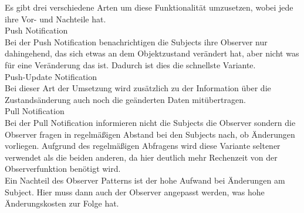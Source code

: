 Es gibt drei verschiedene Arten um diese Funktionalität umzusetzen, wobei jede ihre Vor- und 
Nachteile hat.\\
\newline
Push Notification\\
Bei der Push Notification benachrichtigen die Subjects ihre Observer nur dahingehend, das 
sich etwas an dem Objektzustand verändert hat, aber nicht was für eine Veränderung das ist. 
Dadurch ist dies die schnellste Variante.\\
\newline
Push-Update Notification\\
Bei dieser Art der Umsetzung wird zusätzlich zu der Information über die Zustandsänderung
auch noch die geänderten Daten mitübertragen.\\
\newline
Pull Notification\\
Bei der Pull Notification informieren nicht die Subjects die Observer sondern die Observer 
fragen in regelmäßigen Abstand bei den Subjects nach, ob Änderungen vorliegen. Aufgrund des 
regelmäßigen Abfragens wird diese Variante seltener verwendet als die beiden anderen, da hier 
deutlich mehr Rechenzeit von der Observerfunktion benötigt wird.\\
\newline
Ein Nachteil des Observer Patterns ist der hohe Aufwand bei Änderungen am
Subject. Hier muss dann auch der Observer angepasst werden, was hohe Änderungskosten zur
Folge hat.\\



